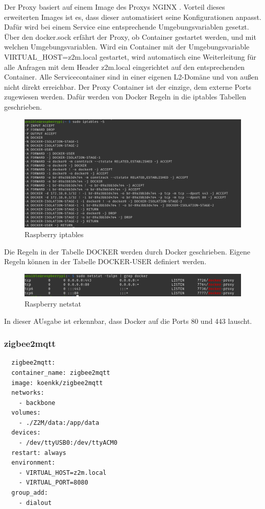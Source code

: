 Der Proxy basiert auf einem Image des Proxys NGINX \cite{nginxpm}. Vorteil dieses erweiterten Images ist es,
dass dieser automatisiert seine Konfigurationen anpasst. Dafür wird bei einem Service eine entsprechende Umgebungsvariablen gesetzt. Über den 
\grqq docker.sock \grqq{} erfährt der Proxy, ob Container gestartet werden, und mit welchen Umgebungsvariablen. Wird ein Container mit der Umgebungsvariable 
\grqq VIRTUAL\_HOST=z2m.local \grqq{} gestartet, wird automatisch eine Weiterleitung für alle Anfragen mit dem Header \grqq z2m.local\grqq{} eingerichtet auf den entsprechenden Container.
Alle Servicecontainer sind in einer eigenen L2-Domäne und von außen nicht direkt erreichbar. Der Proxy Container ist der einzige, dem externe Ports zugewiesen werden.
Dafür werden von Docker Regeln in die \grqq iptables \grqq{} Tabellen geschrieben.

\begin{figure}[H]
  \centering
  \includegraphics[width=1\textwidth]{media/rasp-iptables.png}
  \caption{Raspberry iptables}
\end{figure}

Die Regeln in der Tabelle \grqq DOCKER \grqq{} werden durch Docker geschrieben. Eigene Regeln können in der Tabelle 
\grqq DOCKER-USER \grqq{} definiert werden.

\begin{figure}[H]
  \centering
  \includegraphics[width=1\textwidth]{media/rasp-netstat.png}
  \caption{Raspberry netstat}
\end{figure}

In dieser AUsgabe ist erkennbar, dass Docker auf die Ports 80 und 443 lauscht.

\subsubsection{zigbee2mqtt}
\begin{lstlisting}
  zigbee2mqtt:
  container_name: zigbee2mqtt
  image: koenkk/zigbee2mqtt
  networks:
    - backbone
  volumes:
    - ./Z2M/data:/app/data
  devices:
    - /dev/ttyUSB0:/dev/ttyACM0
  restart: always
  environment:
    - VIRTUAL_HOST=z2m.local
    - VIRTUAL_PORT=8080
  group_add:
    - dialout
\end{lstlisting}

